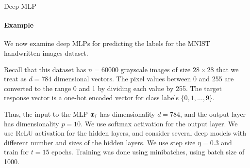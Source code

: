 %
%
%
%
%
\begin{frame}{Deep MLP}
\framesubtitle{Example}
    We now examine deep MLPs for predicting the labels for the
    MNIST handwritten images dataset.

\medskip

Recall that this dataset has
    $n=60000$ grayscale images of size $28\times28$ that we treat as
    $d=784$ dimensional vectors. 
    The pixel values between 0 and 255 are converted to the range 0 and
    1 by dividing each value by 255.
    The target response vector is a one-hot
    encoded vector for class labels $\{0,1,\ldots,9\}$. 

\medskip

    Thus, the input to the MLP ${\boldsymbol x}_i$ has dimensionality $d=784$, and
    the output layer has dimensionality $p=10$. We use softmax
    activation for the output layer. We use ReLU activation for the
    hidden layers, and consider several deep models with different
    number and sizes of the hidden layers. We use step size $\eta=0.3$
    and train for $t=15$ epochs.
    Training was done using minibatches, using batch size of 1000.
\end{frame}

